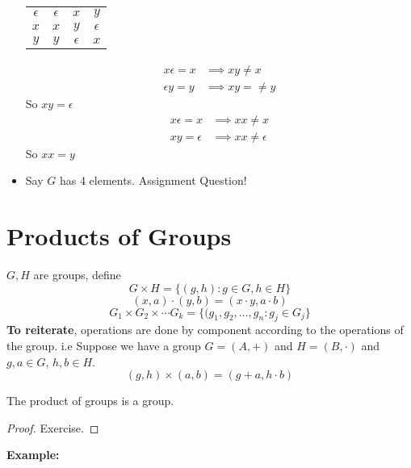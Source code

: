 \documentclass[openany]{report}
\begin{document}
\begin{itemize}
\begin{center}
\begin{tabular}{c|ccc}
             \hline
             $\epsilon$ & $\epsilon$ & $x$ & $y$\\
             $x$ & $x$ & $y$ & $\epsilon$\\
             $y$ & $y$ & $\epsilon$ & $x$\\
        \end{tabular}
    \end{center}
    \begin{align*}
        x\epsilon = x &\implies xy \neq x\\
        \epsilon y  = y &\implies xy = \neq y
    \end{align*}
    So $xy = \epsilon$
    \begin{align*}
        x \epsilon = x &\implies xx \neq x\\
        xy = \epsilon &\implies xx \neq \epsilon
    \end{align*}
    So $xx = y$
    \item Say $G$ has 4 elements. Assignment Question!
\end{itemize}

\section{Products of Groups}
$G, H$ are groups, define 
$$G \times H = \{(g,h) : g \in G, h \in H\}$$
$$(x,a) \cdot (y, b) = (x \cdot y, a \cdot b)$$
$$G_1 \times G_2 \times \cdots G_k = \{(g_1, g_2, \dots, g_n : g_j \in G_j\}$$
\textbf{To reiterate}, operations are done by component according to the operations of the group. i.e Suppose we have a group $G = (A, +)$ and $H = (B, \cdot)$ and $g,a \in G$, $h,b \in H$.
$$(g, h) \times (a,b) = (g + a, h \cdot b)$$
\begin{prop}
    The product of groups is a group.
\end{prop}
\begin{proof}
    Exercise.
\end{proof}
\textbf{Example:}
\end{document}
